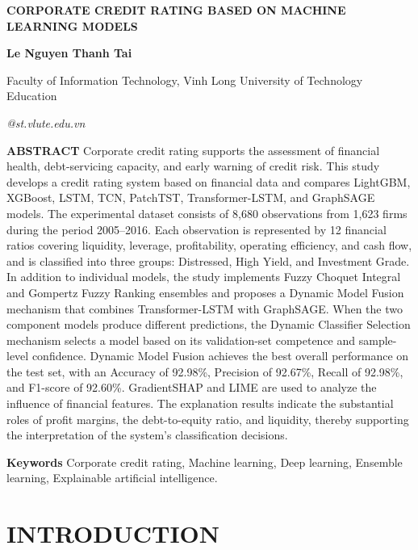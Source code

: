 \documentclass[10pt,twoside]{article}
\makeatletter
\newcommand{\arialfont}{\fontfamily{phv}\selectfont}
\newcommand{\fairsmallfont}{\fontsize{9pt}{11pt}\selectfont}
\newcommand{\fairsuperscript}[1]{%
  \raisebox{0.8ex}{\fontsize{8pt}{8pt}\selectfont #1}%
}
\newcommand{\PaperTitle}{CORPORATE CREDIT RATING BASED ON MACHINE LEARNING MODELS}
\newcommand{\PaperAuthors}{Le Nguyen Thanh Tai\fairsuperscript{1}}
\newcommand{\PaperAffiliations}{%
\fairsuperscript{1}Faculty of Information Technology, Vinh Long University of Technology Education
}
\newcommand{\PaperEmail}{22022001@st.vlute.edu.vn}
\newcommand{\makefairtitle}{%
\thispagestyle{firstpage}%
\begin{center}
{\arialfont\bfseries\fontsize{14pt}{16pt}\selectfont\MakeUppercase{\PaperTitle}\par}
\vspace{3pt}
{\bfseries\fontsize{12pt}{14pt}\selectfont\PaperAuthors\par}
\vspace{3pt}
{\fairsmallfont\PaperAffiliations\par}
\vspace{3pt}
{\itshape\fairsmallfont\PaperEmail\par}
\end{center}
\vspace{6pt}%
}
\newcommand{\FairDash}{\unskip\textemdash\space}
\newenvironment{fairabstract}{%
\begingroup
\fairsmallfont
\itshape
\setlength{\parindent}{1cm}%
\setlength{\parskip}{6pt}%
}{%
\par\endgroup
}
\newcommand{\fairabstracttext}[1]{%
\begin{fairabstract}
\textbf{ABSTRACT}\FairDash #1
\end{fairabstract}
}
\newcommand{\fairkeywords}[1]{%
\begin{fairabstract}
\textbf{Keywords}\FairDash #1
\end{fairabstract}
}
\makeatother
\begin{document}
\makefairtitle

\fairabstracttext{%
Corporate credit rating supports the assessment of financial health, debt-servicing capacity, and early warning of credit risk. This study develops a credit rating system based on financial data and compares LightGBM, XGBoost, LSTM, TCN, PatchTST, Transformer-LSTM, and GraphSAGE models. The experimental dataset consists of 8,680 observations from 1,623 firms during the period 2005--2016. Each observation is represented by 12 financial ratios covering liquidity, leverage, profitability, operating efficiency, and cash flow, and is classified into three groups: Distressed, High Yield, and Investment Grade. In addition to individual models, the study implements Fuzzy Choquet Integral and Gompertz Fuzzy Ranking ensembles and proposes a Dynamic Model Fusion mechanism that combines Transformer-LSTM with GraphSAGE. When the two component models produce different predictions, the Dynamic Classifier Selection mechanism selects a model based on its validation-set competence and sample-level confidence. Dynamic Model Fusion achieves the best overall performance on the test set, with an Accuracy of 92.98\%, Precision of 92.67\%, Recall of 92.98\%, and F1-score of 92.60\%. GradientSHAP and LIME are used to analyze the influence of financial features. The explanation results indicate the substantial roles of profit margins, the debt-to-equity ratio, and liquidity, thereby supporting the interpretation of the system's classification decisions.
}

\fairkeywords{%
Corporate credit rating, Machine learning, Deep learning, Ensemble learning, Explainable artificial intelligence.
}

\section{INTRODUCTION}
\end{document}
